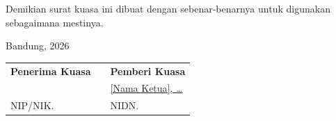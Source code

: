 Demikian surat kuasa ini dibuat dengan sebenar-benarnya untuk digunakan sebagaimana mestinya.

\vspace{1.5cm}

\begin{flushright}
Bandung, \hspace{3cm} 2026

\vspace{0.3cm}

\begin{tabular}{p{5.5cm}p{0.5cm}p{5.5cm}}
    \textbf{Penerima Kuasa} & & \textbf{Pemberi Kuasa} \\[2.5cm]
    \underline{\hspace{5cm}} & & \underline{{[Nama Ketua]}, \ldots} \\
    NIP/NIK. & & NIDN. \\
\end{tabular}
\end{flushright}
